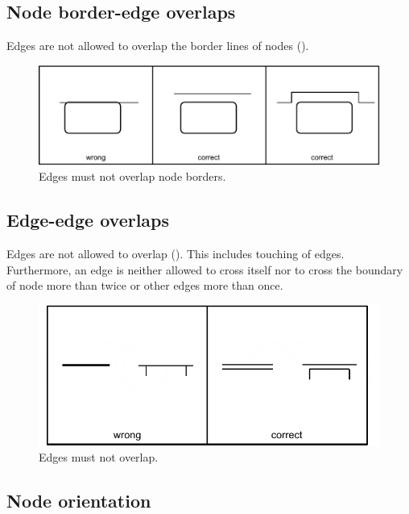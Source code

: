 \subsection{Node border-edge overlaps}

Edges are not allowed to overlap the border lines of nodes ().

\begin{figure}[htb]
  \centering
  \includegraphics[scale=0.8]{images/layout-node-border-edge}
  \caption{Edges must not overlap node borders.}\label{fig:layout3}
\end{figure}

\subsection{Edge-edge overlaps}

Edges are not allowed to overlap (). This includes touching of edges.
Furthermore, an edge is neither allowed to cross itself nor to cross
the boundary of node more than twice or other edges more than once.

\begin{figure}[htb]
  \centering
  \includegraphics[scale=0.8]{images/layout-edge-edge}
  \caption{Edges must not overlap.}\label{fig:layout4}
\end{figure}

\subsection{Node orientation}

